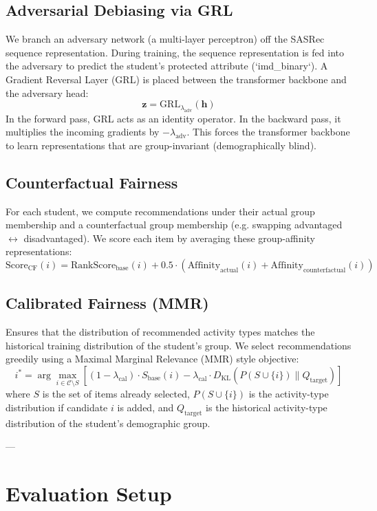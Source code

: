 \documentclass[10pt,journal,compsoc]{IEEEtran}
\begin{document}
\subsection{Adversarial Debiasing via GRL}
We branch an adversary network (a multi-layer perceptron) off the SASRec sequence representation. During training, the sequence representation is fed into the adversary to predict the student's protected attribute (`imd_binary`). A Gradient Reversal Layer (GRL) is placed between the transformer backbone and the adversary head:
$$\mathbf{z} = \text{GRL}_{\lambda_{\text{adv}}}(\mathbf{h})$$
In the forward pass, GRL acts as an identity operator. In the backward pass, it multiplies the incoming gradients by $-\lambda_{\text{adv}}$. This forces the transformer backbone to learn representations that are group-invariant (demographically blind).

\subsection{Counterfactual Fairness}
For each student, we compute recommendations under their actual group membership and a counterfactual group membership (e.g. swapping advantaged $\leftrightarrow$ disadvantaged). We score each item by averaging these group-affinity representations:
$$\text{Score}_{\text{CF}}(i) = \text{RankScore}_{\text{base}}(i) + 0.5 \cdot \left( \text{Affinity}_{\text{actual}}(i) + \text{Affinity}_{\text{counterfactual}}(i) \right)$$

\subsection{Calibrated Fairness (MMR)}
Ensures that the distribution of recommended activity types matches the historical training distribution of the student's group. We select recommendations greedily using a Maximal Marginal Relevance (MMR) style objective:
$$i^* = \arg\max_{i \in \mathcal{C} \setminus S} \left[ (1 - \lambda_{\text{cal}}) \cdot S_{\text{base}}(i) - \lambda_{\text{cal}} \cdot D_{\text{KL}}\left( P(S \cup \{i\}) \parallel Q_{\text{target}} \right) \right]$$
where $S$ is the set of items already selected, $P(S \cup \{i\})$ is the activity-type distribution if candidate $i$ is added, and $Q_{\text{target}}$ is the historical activity-type distribution of the student's demographic group.

---

\section{Evaluation Setup}
\end{document}
